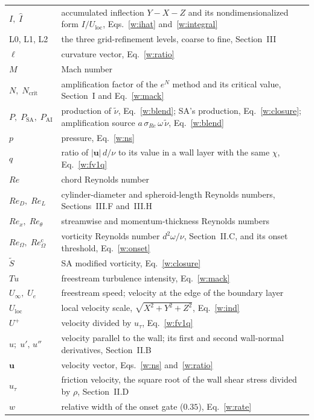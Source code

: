 \documentclass[conf]{new-aiaa}
\begin{document}
{\begin{longtable*}{@{}l @{\quad=\quad} p{4.5in}@{}}
$I,\;\hat I$ & accumulated inflection $Y-X-Z$ and its nondimensionalized form $I/U_\mathrm{loc}$, Eqs.~\eqref{w:ihat} and~\eqref{w:integral} \\
L0, L1, L2 & the three grid-refinement levels, coarse to fine, Section~III \\
$\boldsymbol\ell$ & curvature vector, Eq.~\eqref{w:ratio} \\
$M$ & Mach number \\
$N,\;N_\mathrm{crit}$ & amplification factor of the $e^N$ method and its critical value, Section~I and Eq.~\eqref{w:mack} \\
$P,\;P_\mathrm{SA},\;P_\mathrm{AI}$ & production of $\tilde\nu$, Eq.~\eqref{w:blend}; SA's production, Eq.~\eqref{w:closure}; amplification source $a\,\sigma_{Re}\,\omega\,\tilde\nu$, Eq.~\eqref{w:blend} \\
$p$ & pressure, Eq.~\eqref{w:ns} \\
$q$ & ratio of $|\mathbf u|\,d/\nu$ to its value in a wall layer with the same $\chi$, Eq.~\eqref{w:fv1q} \\
$Re$ & chord Reynolds number \\
$Re_D,\;Re_L$ & cylinder-diameter and spheroid-length Reynolds numbers, Sections~III.F and~III.H \\
$Re_x,\;Re_\theta$ & streamwise and momentum-thickness Reynolds numbers \\
$Re_\Omega,\;Re_\Omega^{\mathrm c}$ & vorticity Reynolds number $d^2\omega/\nu$, Section~II.C, and its onset threshold, Eq.~\eqref{w:onset} \\
$\tilde S$ & SA modified vorticity, Eq.~\eqref{w:closure} \\
$Tu$ & freestream turbulence intensity, Eq.~\eqref{w:mack} \\
$U_\infty,\;U_e$ & freestream speed; velocity at the edge of the boundary layer \\
$U_\mathrm{loc}$ & local velocity scale, $\sqrt{X^2+Y^2+Z^2}$, Eq.~\eqref{w:ind} \\
$U^+$ & velocity divided by $u_\tau$, Eq.~\eqref{w:fv1q} \\
$u;\;u',\,u''$ & velocity parallel to the wall; its first and second wall-normal derivatives, Section~II.B \\
$\mathbf u$ & velocity vector, Eqs.~\eqref{w:ns} and~\eqref{w:ratio} \\
$u_\tau$ & friction velocity, the square root of the wall shear stress divided by $\rho$, Section~II.D \\
$w$ & relative width of the onset gate ($0.35$), Eq.~\eqref{w:rate} \\

\end{longtable*}}
\end{document}
